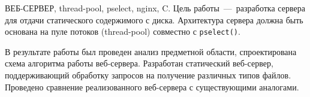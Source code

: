 \begin{essay}{ВЕБ-СЕРВЕР, thread-pool, pselect, nginx, C.}
	Цель работы~---~разработка сервера для отдачи статического содержимого с диска.
	Архитектура сервера должна быть основана на пуле потоков (thread-pool) совместно с \texttt{pselect()}.
	
	В результате работы был проведен анализ предметной области, спроектирована схема алгоритма работы веб-сервера.
	Разработан статический веб-сервер, поддерживающий обработку запросов на получение различных типов файлов.
	Проведено сравнение реализованного веб-сервера с существующими аналогами.
\end{essay}